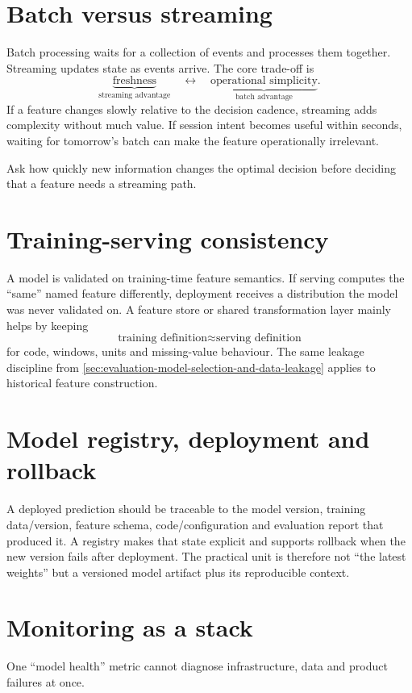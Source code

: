 \section{Batch versus streaming}
\label{sec:systems-batch-streaming}
Batch processing waits for a collection of events and processes them together.
Streaming updates state as events arrive.
The core trade-off is
\[
\underbrace{\text{freshness}}_{\text{streaming advantage}}
\quad\longleftrightarrow\quad
\underbrace{\text{operational simplicity}}_{\text{batch advantage}}.
\]
If a feature changes slowly relative to the decision cadence, streaming adds complexity without much value.
If session intent becomes useful within seconds, waiting for tomorrow's batch can make the feature operationally irrelevant.

\begin{calloutpractical}
Ask how quickly new information changes the optimal decision before deciding that a feature needs a streaming path.
\end{calloutpractical}

\section{Training-serving consistency}
\label{sec:systems-training-serving-skew}
A model is validated on training-time feature semantics.
If serving computes the ``same'' named feature differently, deployment receives a distribution the model was never validated on.
A feature store or shared transformation layer mainly helps by keeping
\[
\boxed{
\text{training definition}
\approx
\text{serving definition}
}
\]
for code, windows, units and missing-value behaviour.
The same leakage discipline from \cref{sec:evaluation-model-selection-and-data-leakage} applies to historical feature construction.

\section{Model registry, deployment and rollback}
\label{sec:systems-registry}
A deployed prediction should be traceable to the model version, training data/version, feature schema, code/configuration and evaluation report that produced it.
A registry makes that state explicit and supports rollback when the new version fails after deployment.
The practical unit is therefore not ``the latest weights'' but a versioned model artifact plus its reproducible context.

\section{Monitoring as a stack}
\label{sec:systems-monitoring}
One ``model health'' metric cannot diagnose infrastructure, data and product failures at once.

